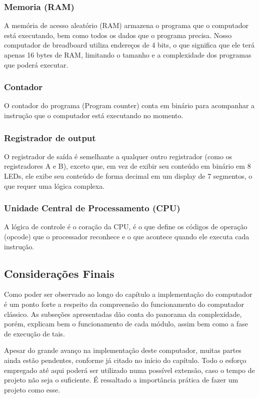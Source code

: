 \subsubsection{Memoria (RAM)}
A memória de acesso aleatório (RAM) armazena o programa que o computador está executando, bem como todos os dados que o programa precisa. Nosso computador de breadboard utiliza endereços de 4 bits, o que significa que ele terá apenas 16 bytes de RAM, limitando o tamanho e a complexidade dos programas que poderá executar.

\subsubsection{Contador}
O contador do programa (Program counter) conta em binário para acompanhar a instrução que o computador está executando no momento.

\subsubsection{Registrador de output}
O registrador de saída é semelhante a qualquer outro registrador (como os registradores A e B), exceto que, em vez de exibir seu conteúdo em binário em 8 LEDs, ele exibe seu conteúdo de forma decimal em um display de 7 segmentos, o que requer uma lógica complexa.

\subsubsection{Unidade Central de Processamento (CPU)}
A lógica de controle é o coração da CPU, é o que define os códigos de operação (opcode) que o processador reconhece e o que acontece quando ele executa cada instrução.

\subsection{Considerações Finais}

Como poder ser observado ao longo do capítulo a implementação do computador é um ponto forte a respeito da compreensão do funcionamento do computador clássico. As subseções apresentadas dão conta do panorama da complexidade, porém, explicam bem o funcionamento de cada módulo, assim bem como a fase de execução de tais.

Apesar do grande avanço na implementação deste computador, muitas partes ainda estão pendentes, conforme já citado no início do capítulo. Todo o esforço empregado até aqui poderá ser utilizado numa possível extensão, caso o tempo de projeto não seja o suficiente. É ressaltado a importância prática de fazer um projeto como esse.


\newpage


